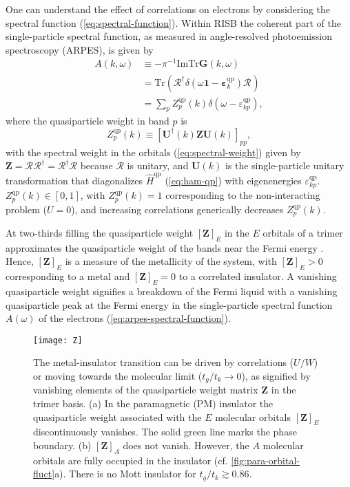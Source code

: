\documentclass[reprint,aps,prb,amsmath,amssymb]{revtex4-2}
\begin{document}
One can understand the effect of correlations on electrons by considering the spectral function (\cref{eq:spectral-function}). Within RISB the coherent part of the single-particle spectral function, as measured in angle-resolved photoemission spectroscopy (ARPES), is given by
%
\begin{align} \label{eq:arpes-spectral-function}
A(k,\omega) & \equiv -\pi^{-1} \mathrm{Im} \mathrm{Tr} \bm{G}(k,\omega) \nonumber \\
%
& = \mathrm{Tr} ( \bm{\mathcal{R}}^{\dagger} \delta(\omega \bm{1} - \bm{\varepsilon}_k^{\mathrm{qp}}) \bm{\mathcal{R}}^{}) \nonumber \\
%
& = \sum_{p} Z_p^{\mathrm{qp}}(k) \delta(\omega - \varepsilon_{kp}^{\mathrm{qp}}),
\end{align}
%
where the quasiparticle weight in band $p$ is
%
\begin{equation} \label{eq:Z-qp}
Z_p^{\mathrm{qp}}(k) \equiv [\bm{U}^{\dagger}(k) \bm{Z} \bm{U}(k)]_{pp},
\end{equation}
%
with the spectral weight in the orbitals (\cref{eq:spectral-weight}) given by $\bm{Z} = \bm{\mathcal{R}}^{} \bm{\mathcal{R}}^{\dagger} = \bm{\mathcal{R}}^{\dagger} \bm{\mathcal{R}}$ because $\bm{\mathcal{R}}$ is unitary, and $\bm{U}(k)$ is the single-particle unitary transformation that diagonalizes $\hat{H}^{\mathrm{qp}}$ (\cref{eq:ham-qp}) with eigenenergies $\varepsilon_{kp}^{\mathrm{qp}}$. $Z_p^{\mathrm{qp}}(k) \in [0,1]$, with $Z_p^{\mathrm{qp}}(k) = 1$ corresponding to the non-interacting problem ($U=0$), and increasing correlations generically decreases $Z_p^{\mathrm{qp}}(k)$.

At two-thirds filling the quasiparticle weight $[\bm{Z}]_E$ in the $E$ orbitals of a trimer approximates the quasiparticle weight of the bands near the Fermi energy \cite{Nourse2021}. Hence, $[\bm{Z}]_E$ is a measure of the metallicity of the system, with $[\bm{Z}]_E > 0$ corresponding to a metal and $[\bm{Z}]_E = 0$ to a correlated insulator. A vanishing quasiparticle weight signifies a breakdown of the Fermi liquid with a vanishing quasiparticle peak at the Fermi energy in the single-particle spectral function $A(\omega)$ of the electrons (\cref{eq:arpes-spectral-function}).

\begin{figure}
	\centering
	\texttt{[image: Z]}
	\caption{\label{fig:Z}
		The metal-insulator transition can be driven by correlations ($U/W$) or moving towards the molecular limit ($t_g/t_k \rightarrow 0$), as signified by vanishing elements of the quasiparticle weight matrix $\bm{Z}$ in the trimer basis.
		(a) In the paramagnetic (PM) insulator the quasiparticle weight associated with the $E$ molecular orbitals $[\bm{Z}]_E$ discontinuously vanishes. The solid green line marks the phase boundary.
		(b) $[\bm{Z}]_A$ does not vanish. However, the $A$ molecular orbitals are fully occupied in the insulator (cf. \cref{fig:para-orbital-fluct}a).
		There is no Mott insulator for $t_g / t_k \gtrsim 0.86$. 
	}
\end{figure}
\end{document}
